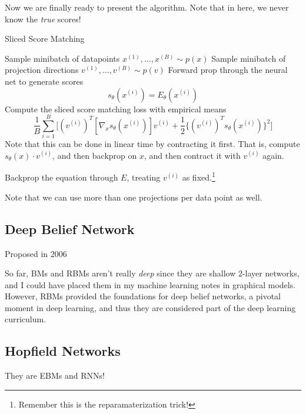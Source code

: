     \begin{algo}
      Now we are finally ready to present the algorithm. Note that in here, we never know the \textit{true} scores! 
      \begin{algorithm}[H]
      \caption{Sliced Score Matching}
      \label{alg:sliced_score_matching}
      \begin{algorithmic}[1]  

          \State Sample minibatch of datapoints $x^{(1)}, \ldots, x^{(B)} \sim p(x)$ 
          \State Sample minibatch of projection directions $v^{(1)}, \ldots, v^{(B)} \sim p(v)$ 
          \State Forward prop through the neural net to generate scores 
          \begin{equation}
            s_\theta (x^{(i)}) = E_\theta(x^{(i)})
          \end{equation}
          \State Compute the sliced score matching loss with empirical means 
          \begin{equation}
            \frac{1}{B} \sum_{i=1}^B \Big[ (v^{(i)})^T [\nabla_x s_\theta (x^{(i)})] v^{(i)} + \frac{1}{2} \big\{ (v^{(i)})^T s_\theta(x^{(i)}) \big\}^2 \Big]
          \end{equation} 
          Note that this can be done in linear time by contracting it first. That is, compute $s_\theta (x) \cdot v^{(i)}$, and then backprop on $x$, and then contract it with $v^{(i)}$ again. 

          \State Backprop the equation through $E$, treating $v^{(i)}$ as fixed.\footnote{Remember this is the reparamaterization trick!}
        \EndWhile
      \end{algorithmic}
      \end{algorithm}
      Note that we can use more than one projections per data point as well. 
    \end{algo}

\subsection{Deep Belief Network} 

  Proposed in 2006

  So far, BMs and RBMs aren't really \textit{deep} since they are shallow 2-layer networks, and I could have placed them in my machine learning notes in graphical models. However, RBMs provided the foundations for deep belief networks, a pivotal moment in deep learning, and thus they are considered part of the deep learning curriculum. 

\subsection{Hopfield Networks}

  They are EBMs and RNNs!

